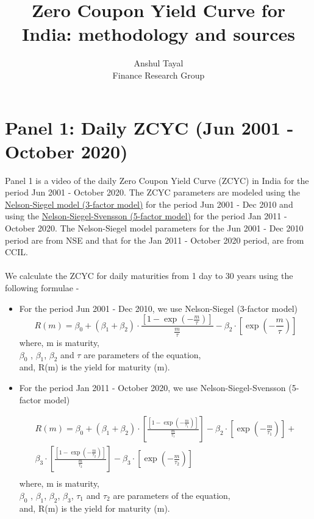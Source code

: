 \documentclass[12pt]{article}
\begin{document}
\begin{titlepage}
  \title{Zero Coupon Yield Curve for India: methodology and sources}
  \author{Anshul Tayal\\ Finance Research Group}
  \date{}
  \maketitle
\end{titlepage}
\section*{Panel 1: Daily ZCYC (Jun 2001 - October 2020) }
Panel 1 is a video of the daily Zero Coupon Yield Curve (ZCYC) in India for the period Jun 2001 - October 2020. 
The ZCYC parameters are modeled using the \href{https://econpapers.repec.org/article/ucpjnlbus/v_3a60_3ay_3a1987_3ai_3a4_3ap_3a473-89.htm}{Nelson-Siegel model (3-factor model)} for the period Jun 2001 - Dec 2010 and using the \href{https://econpapers.repec.org/paper/nbrnberwo/4871.htm}{Nelson-Siegel-Svensson (5-factor model)} for the period Jan 2011 - October 2020. 
The Nelson-Siegel model parameters for the Jun 2001 - Dec 2010 period are from NSE and that for the Jan 2011 - October 2020 period, are from CCIL. \\ \\

We calculate the ZCYC for daily maturities from 1 day to 30 years using the following formulae - 
\begin{itemize}
\item For the period Jun 2001 - Dec 2010, we use Nelson-Siegel (3-factor model)
  \begin{equation}
    R(m)= \beta_0 + (\beta_1 + \beta_2)\cdot\frac{[1-\exp(-\frac{m}{\tau})]}{\frac{m}{\tau}} - \beta_2\cdot[\exp(-\frac{m}{\tau})] 
  \end{equation}
  where, m is maturity,\\
  $\beta_0$ , $\beta_1$, $\beta_2$ and $\tau$ are parameters of the equation,\\
  and, R(m) is the yield for maturity (m).
  
\item For the period Jan 2011 - October 2020, we use Nelson-Siegel-Svensson (5-factor model) 
  
  \begin{equation}
    \begin{split}
      R(m)= \beta_0 + (\beta_1 + \beta_2)\cdot[\frac{[1-\exp(-\frac{m}{\tau_1})]}{\frac{m}{\tau_1}}] - \beta_2\cdot[\exp(-\frac{m}{\tau_1})] + \\
      \beta_3\cdot[\frac{[1-\exp(-\frac{m}{\tau_2})]}{\frac{m}{\tau_2}}]- \beta_3\cdot[\exp(-\frac{m}{\tau_2})] \\
    \end{split}
  \end{equation}
  where, m is maturity,\\
  $\beta_0$ , $\beta_1$, $\beta_2$, $\beta_3$, $\tau_1$ and $\tau_2$ are parameters of the equation,\\
  and, R(m) is the yield for maturity (m).

\end{itemize} 
\end{document}
